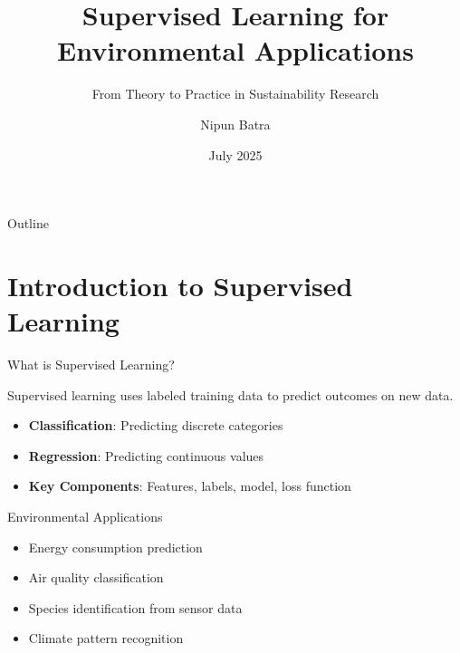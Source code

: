 \documentclass{sustainabilitylab}
\title{Supervised Learning for Environmental Applications}
\subtitle{From Theory to Practice in Sustainability Research}
\author{Nipun Batra}
\institute{Sustainability Lab \\ IIT Gandhinagar}
\date{July 2025}
\begin{document}
\begin{frame}
  \titlepage
\end{frame}

\begin{frame}{Outline}
  \tableofcontents
\end{frame}


\section{Introduction to Supervised Learning}

\begin{frame}{What is Supervised Learning?}

Supervised learning uses labeled training data to predict outcomes on new data.

\begin{itemize}
  \item \textbf{Classification}: Predicting discrete categories
  \item \textbf{Regression}: Predicting continuous values
  \item \textbf{Key Components}: Features, labels, model, loss function
\end{itemize}

\end{frame}

\begin{frame}{Environmental Applications}

\begin{itemize}
  \item Energy consumption prediction
  \item Air quality classification
  \item Species identification from sensor data
  \item Climate pattern recognition
\end{itemize}

\end{frame}
\end{document}

